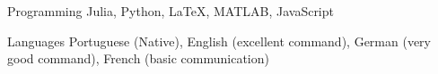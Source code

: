 

\begin{cvskills}

  \cvskill
    {Programming} %
    {Julia, Python, LaTeX, MATLAB, JavaScript} %

  \cvskill
    {Languages} %
    {Portuguese (Native), English (excellent command), 
    German (very good command), French (basic communication)} %

\end{cvskills}

